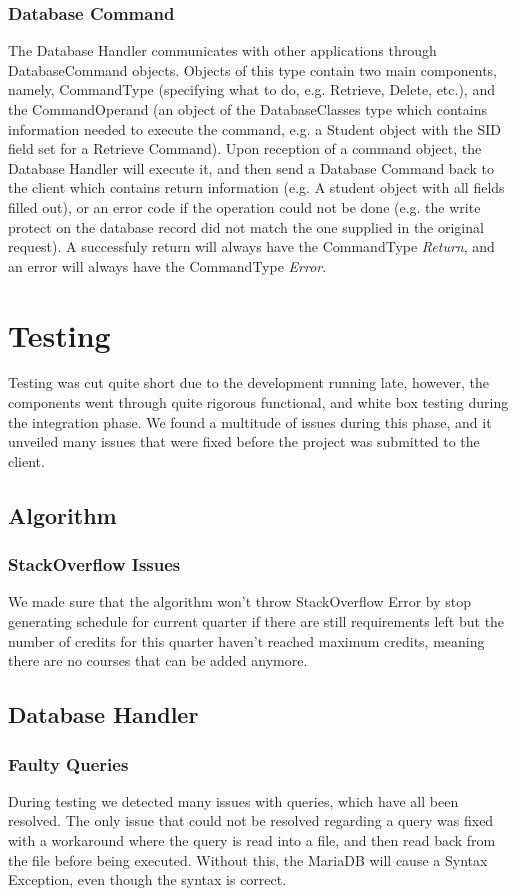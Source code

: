 \documentclass[letterpaper]{report}
\begin{document}
	\subsection{Database Command}
	The Database Handler communicates with other applications through DatabaseCommand objects. Objects of this type contain two main components, namely, CommandType (specifying what to do, e.g. Retrieve, Delete, etc.), and the CommandOperand (an object of the DatabaseClasses type which contains information needed to execute the command, e.g. a Student object with the SID field set for a Retrieve Command). Upon reception of a command object, the Database Handler will execute it, and then send a Database Command back to the client which contains return information (e.g. A student object with all fields filled out), or an error code if the operation could not be done (e.g. the write protect on the database record did not match the one supplied in the original request). A successfuly return will always have the CommandType \textit{Return}, and an error will always have the CommandType \textit{Error}. 
	\chapter{Testing}
	Testing was cut quite short due to the development running late, however, the components went through quite rigorous functional, and white box testing during the integration phase. We found a multitude of issues during this phase, and it unveiled many issues that were fixed before the project was submitted to the client.
	\section{Algorithm}
	
	\subsection{StackOverflow Issues}
	We made sure that the algorithm won't throw StackOverflow Error by stop generating schedule for current quarter if there are still requirements left but the number of credits for this quarter haven't reached maximum credits, meaning there are no courses that can be added anymore.
	
	\section{Database Handler}
	\subsection{Faulty Queries}
	During testing we detected many issues with queries, which have all been resolved. The only issue that could not be resolved regarding a query was fixed with a workaround where the query is read into a file, and then read back from the file before being executed. Without this, the MariaDB will cause a Syntax Exception, even though the syntax is correct. 
	
\end{document}
